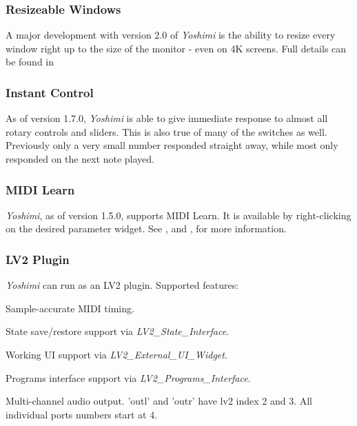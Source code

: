 \documentclass[
 11pt,
 twoside,
 a4paper,
 final                                 %
]{article}
\begin{document}
\subsubsection{Resizeable Windows}
\label{subsubsec:new_features_resizable_windows}
   A major development with version 2.0 of \textsl{Yoshimi} is the ability to
   resize every window right up to the size of the monitor - even on 4K screens.
   Full details can be found in 

\subsubsection{Instant Control}
\label{subsubsec:new_features_instant_control}
   As of version 1.7.0, \textsl{Yoshimi} is able to give immediate response to
   almost all rotary controls and sliders. This is also true of many of the
   switches as well. Previously only a very small number responded straight away,
   while most only responded on the next note played.

\subsubsection{MIDI Learn}
\label{subsubsec:new_features_midi_learn}

   \textsl{Yoshimi}, as of version 1.5.0, supports MIDI Learn.
   It is available by right-clicking on the desired parameter widget.
   See ,
   and , for more information.

\subsubsection{LV2 Plugin}
\label{subsubsec:new_features_lv2_plugin}

   \textsl{Yoshimi} can run as an LV2 plugin.  Supported features:

   \begin{enumber}
      \item Sample-accurate MIDI timing.
      \item State save/restore support via \textsl{LV2\_State\_Interface}.
      \item Working UI support via \textsl{LV2\_External\_UI\_Widget}.
      \item Programs interface support via \textsl{LV2\_Programs\_Interface}.
      \item Multi-channel audio output.
         'outl' and 'outr' have lv2 index 2 and 3.
         All individual ports numbers start at 4.
   \end{enumber}
\end{document}

